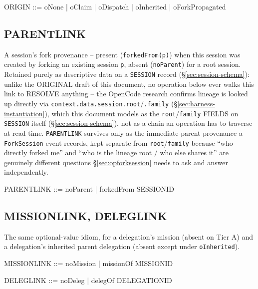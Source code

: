 \documentclass[a4paper,10pt,fleqn]{article}
\newcommand{\field}[1]{\texttt{#1}}
\begin{document}
\begin{zed}
ORIGIN ::= oNone | oClaim | oDispatch | oInherited | oForkPropagated
\end{zed}

\subsection{PARENTLINK}

A session's fork provenance -- present (\field{forkedFrom(p)}) when
this session was created by forking an existing session \field{p},
absent (\field{noParent}) for a root session. Retained purely as
descriptive data on a \field{SESSION} record
(\S\ref{sec:session-schema}): unlike the ORIGINAL draft of this
document, no operation below ever walks this link to RESOLVE anything
-- the OpenCode research confirms lineage is looked up directly via
\field{context.data.session.root}/\field{.family}
(\S\ref{sec:harness-instantiation}), which this document models as the
\field{root}/\field{family} FIELDS on \field{SESSION} itself
(\S\ref{sec:session-schema}), not as a chain an operation has to
traverse at read time. \field{PARENTLINK} survives only as the
immediate-parent provenance a \field{ForkSession} event records, kept
separate from \field{root}/\field{family} because ``who directly forked
me'' and ``who is the lineage root / who else shares it'' are
genuinely different questions \S\ref{sec:opforksession} needs to ask
and answer independently.

\begin{zed}
PARENTLINK ::= noParent | forkedFrom \ldata SESSIONID \rdata
\end{zed}

\subsection{MISSIONLINK, DELEGLINK}

The same optional-value idiom, for a delegation's mission (absent on
Tier A) and a delegation's inherited parent delegation (absent except
under \field{oInherited}).

\begin{zed}
MISSIONLINK ::= noMission | missionOf \ldata MISSIONID \rdata
\end{zed}

\begin{zed}
DELEGLINK ::= noDeleg | delegOf \ldata DELEGATIONID \rdata
\end{zed}

\end{document}
